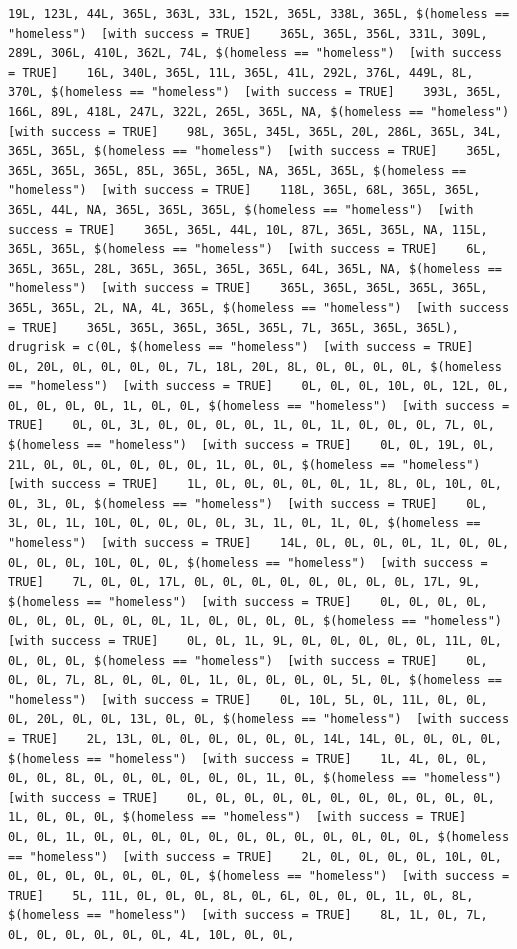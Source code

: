 \documentclass{tufte-book}\usepackage[]{graphicx}\usepackage[]{xcolor}
\makeatletter
\newenvironment{kframe}{%
 \def\at@end@of@kframe{}%
 \ifinner\ifhmode%
  \def\at@end@of@kframe{\end{minipage}}%
  \begin{minipage}{\columnwidth}%
 \fi\fi%
 \def\FrameCommand##1{\hskip\@totalleftmargin \hskip-\fboxsep
 \colorbox{shadecolor}{##1}\hskip-\fboxsep
     \hskip-\linewidth \hskip-\@totalleftmargin \hskip\columnwidth}%
 \MakeFramed {\advance\hsize-\width
   \@totalleftmargin\z@ \linewidth\hsize
   \@setminipage}}%
 {\par\unskip\endMakeFramed%
 \at@end@of@kframe}
\newenvironment{knitrout}{}{} %
\makeatother
\begin{document}
\begin{knitrout}
\begin{kframe}
\begin{verbatim}
19L, 123L, 44L, 365L, 363L, 33L, 152L, 365L, 338L, 365L, $(homeless == "homeless")  [with success = TRUE]    365L, 365L, 356L, 331L, 309L, 289L, 306L, 410L, 362L, 74L, $(homeless == "homeless")  [with success = TRUE]    16L, 340L, 365L, 11L, 365L, 41L, 292L, 376L, 449L, 8L, 370L, $(homeless == "homeless")  [with success = TRUE]    393L, 365L, 166L, 89L, 418L, 247L, 322L, 265L, 365L, NA, $(homeless == "homeless")  [with success = TRUE]    98L, 365L, 345L, 365L, 20L, 286L, 365L, 34L, 365L, 365L, $(homeless == "homeless")  [with success = TRUE]    365L, 365L, 365L, 365L, 85L, 365L, 365L, NA, 365L, 365L, $(homeless == "homeless")  [with success = TRUE]    118L, 365L, 68L, 365L, 365L, 365L, 44L, NA, 365L, 365L, 365L, $(homeless == "homeless")  [with success = TRUE]    365L, 365L, 44L, 10L, 87L, 365L, 365L, NA, 115L, 365L, 365L, $(homeless == "homeless")  [with success = TRUE]    6L, 365L, 365L, 28L, 365L, 365L, 365L, 365L, 64L, 365L, NA, $(homeless == "homeless")  [with success = TRUE]    365L, 365L, 365L, 365L, 365L, 365L, 365L, 2L, NA, 4L, 365L, $(homeless == "homeless")  [with success = TRUE]    365L, 365L, 365L, 365L, 365L, 7L, 365L, 365L, 365L), drugrisk = c(0L, $(homeless == "homeless")  [with success = TRUE]    0L, 20L, 0L, 0L, 0L, 0L, 7L, 18L, 20L, 8L, 0L, 0L, 0L, 0L, $(homeless == "homeless")  [with success = TRUE]    0L, 0L, 0L, 10L, 0L, 12L, 0L, 0L, 0L, 0L, 0L, 1L, 0L, 0L, $(homeless == "homeless")  [with success = TRUE]    0L, 0L, 3L, 0L, 0L, 0L, 0L, 1L, 0L, 1L, 0L, 0L, 0L, 7L, 0L, $(homeless == "homeless")  [with success = TRUE]    0L, 0L, 19L, 0L, 21L, 0L, 0L, 0L, 0L, 0L, 0L, 1L, 0L, 0L, $(homeless == "homeless")  [with success = TRUE]    1L, 0L, 0L, 0L, 0L, 0L, 1L, 8L, 0L, 10L, 0L, 0L, 3L, 0L, $(homeless == "homeless")  [with success = TRUE]    0L, 3L, 0L, 1L, 10L, 0L, 0L, 0L, 0L, 3L, 1L, 0L, 1L, 0L, $(homeless == "homeless")  [with success = TRUE]    14L, 0L, 0L, 0L, 0L, 1L, 0L, 0L, 0L, 0L, 0L, 10L, 0L, 0L, $(homeless == "homeless")  [with success = TRUE]    7L, 0L, 0L, 17L, 0L, 0L, 0L, 0L, 0L, 0L, 0L, 0L, 17L, 9L, $(homeless == "homeless")  [with success = TRUE]    0L, 0L, 0L, 0L, 0L, 0L, 0L, 0L, 0L, 0L, 1L, 0L, 0L, 0L, 0L, $(homeless == "homeless")  [with success = TRUE]    0L, 0L, 1L, 9L, 0L, 0L, 0L, 0L, 0L, 11L, 0L, 0L, 0L, 0L, $(homeless == "homeless")  [with success = TRUE]    0L, 0L, 0L, 7L, 8L, 0L, 0L, 0L, 1L, 0L, 0L, 0L, 0L, 5L, 0L, $(homeless == "homeless")  [with success = TRUE]    0L, 10L, 5L, 0L, 11L, 0L, 0L, 0L, 20L, 0L, 0L, 13L, 0L, 0L, $(homeless == "homeless")  [with success = TRUE]    2L, 13L, 0L, 0L, 0L, 0L, 0L, 0L, 14L, 14L, 0L, 0L, 0L, 0L, $(homeless == "homeless")  [with success = TRUE]    1L, 4L, 0L, 0L, 0L, 0L, 8L, 0L, 0L, 0L, 0L, 0L, 0L, 1L, 0L, $(homeless == "homeless")  [with success = TRUE]    0L, 0L, 0L, 0L, 0L, 0L, 0L, 0L, 0L, 0L, 0L, 1L, 0L, 0L, 0L, $(homeless == "homeless")  [with success = TRUE]    0L, 0L, 1L, 0L, 0L, 0L, 0L, 0L, 0L, 0L, 0L, 0L, 0L, 0L, 0L, $(homeless == "homeless")  [with success = TRUE]    2L, 0L, 0L, 0L, 0L, 10L, 0L, 0L, 0L, 0L, 0L, 0L, 0L, 0L, $(homeless == "homeless")  [with success = TRUE]    5L, 11L, 0L, 0L, 0L, 8L, 0L, 6L, 0L, 0L, 0L, 1L, 0L, 8L, $(homeless == "homeless")  [with success = TRUE]    8L, 1L, 0L, 7L, 0L, 0L, 0L, 0L, 0L, 0L, 4L, 10L, 0L, 0L, 
\end{verbatim}
\end{kframe}
\end{knitrout}
\end{document}
